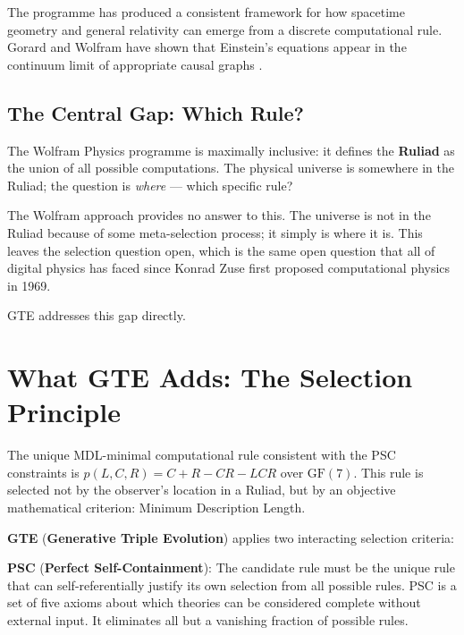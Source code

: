 \documentclass[11pt,a4paper]{article}
\newcommand{\term}[1]{\textbf{#1}}
\begin{document}
The programme has produced a consistent framework for how spacetime geometry and
general relativity can emerge from a discrete computational rule.  Gorard and
Wolfram have shown that Einstein's equations appear in the continuum limit of
appropriate causal graphs \cite{SpivackGTECompleteFramework}.

\subsection{The Central Gap: Which Rule?}

The Wolfram Physics programme is maximally inclusive: it defines the
\term{Ruliad} as the union of all possible computations.  The physical universe
is somewhere in the Ruliad; the question is \emph{where} — which specific rule?

The Wolfram approach provides no answer to this.  The universe is not in the
Ruliad because of some meta-selection process; it simply is where it is.
This leaves the selection question open, which is the same open question that
all of digital physics has faced since Konrad Zuse first proposed computational
physics in 1969.

GTE addresses this gap directly.

\section{What GTE Adds: The Selection Principle}
\label{sec:selection}

\begin{tcolorbox}[colback=boxorange,colframe=orange!60!black,
  title=GTE's answer to ``which rule?'']
The unique MDL-minimal computational rule consistent with the PSC constraints
is $p(L,C,R) = C + R - CR - LCR$ over $\mathrm{GF}(7)$.  This rule is selected
not by the observer's location in a Ruliad, but by an objective mathematical
criterion: Minimum Description Length.
\end{tcolorbox}

\term{GTE} (\term{Generative Triple Evolution}) applies two
interacting selection criteria:

\textbf{PSC} (\term{Perfect Self-Containment}):  The candidate rule must be
the unique rule that can self-referentially justify its own selection from
all possible rules.  PSC is a set of five axioms about which theories can be
considered complete without external input.  It eliminates all but a vanishing
fraction of possible rules.
\end{document}
